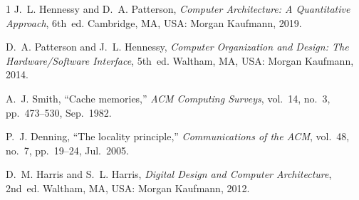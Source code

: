 \documentclass[conference]{IEEEtran}
\begin{document}
\begin{thebibliography}{1}
J.~L. Hennessy and D.~A. Patterson, \emph{Computer Architecture: A Quantitative
Approach}, 6th~ed. Cambridge, MA, USA: Morgan Kaufmann, 2019.

D.~A. Patterson and J.~L. Hennessy, \emph{Computer Organization and Design: The
Hardware/Software Interface}, 5th~ed. Waltham, MA, USA: Morgan Kaufmann, 2014.

A.~J. Smith, ``Cache memories,'' \emph{ACM Computing Surveys}, vol.~14, no.~3,
pp.~473--530, Sep.~1982.

P.~J. Denning, ``The locality principle,'' \emph{Communications of the ACM},
vol.~48, no.~7, pp.~19--24, Jul.~2005.

D.~M. Harris and S.~L. Harris, \emph{Digital Design and Computer Architecture},
2nd~ed. Waltham, MA, USA: Morgan Kaufmann, 2012.
\end{thebibliography}
\end{document}
